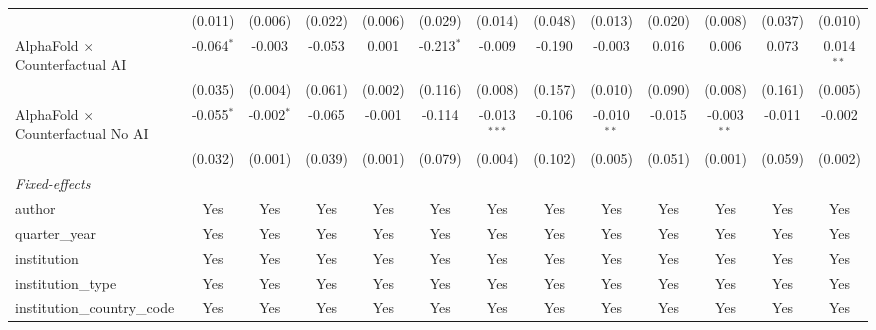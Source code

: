 \begin{tabular}{lcccccccccccc}
                                            & (0.011)       & (0.006)      & (0.022)     & (0.006) & (0.029)      & (0.014)        & (0.048) & (0.013)       & (0.020)       & (0.008)       & (0.037)      & (0.010)\\   
   AlphaFold $\times$ Counterfactual AI     & -0.064$^{*}$  & -0.003       & -0.053      & 0.001   & -0.213$^{*}$ & -0.009         & -0.190  & -0.003        & 0.016         & 0.006         & 0.073        & 0.014$^{**}$\\   
                                            & (0.035)       & (0.004)      & (0.061)     & (0.002) & (0.116)      & (0.008)        & (0.157) & (0.010)       & (0.090)       & (0.008)       & (0.161)      & (0.005)\\   
   AlphaFold $\times$ Counterfactual No AI  & -0.055$^{*}$  & -0.002$^{*}$ & -0.065      & -0.001  & -0.114       & -0.013$^{***}$ & -0.106  & -0.010$^{**}$ & -0.015        & -0.003$^{**}$ & -0.011       & -0.002\\   
                                            & (0.032)       & (0.001)      & (0.039)     & (0.001) & (0.079)      & (0.004)        & (0.102) & (0.005)       & (0.051)       & (0.001)       & (0.059)      & (0.002)\\   
   \midrule
   \emph{Fixed-effects}\\
   author                                   & Yes           & Yes          & Yes         & Yes     & Yes          & Yes            & Yes     & Yes           & Yes           & Yes           & Yes          & Yes\\  
   quarter\_year                            & Yes           & Yes          & Yes         & Yes     & Yes          & Yes            & Yes     & Yes           & Yes           & Yes           & Yes          & Yes\\  
   institution                              & Yes           & Yes          & Yes         & Yes     & Yes          & Yes            & Yes     & Yes           & Yes           & Yes           & Yes          & Yes\\  
   institution\_type                        & Yes           & Yes          & Yes         & Yes     & Yes          & Yes            & Yes     & Yes           & Yes           & Yes           & Yes          & Yes\\  
   institution\_country\_code               & Yes           & Yes          & Yes         & Yes     & Yes          & Yes            & Yes     & Yes           & Yes           & Yes           & Yes          & Yes\\  

\end{tabular}

